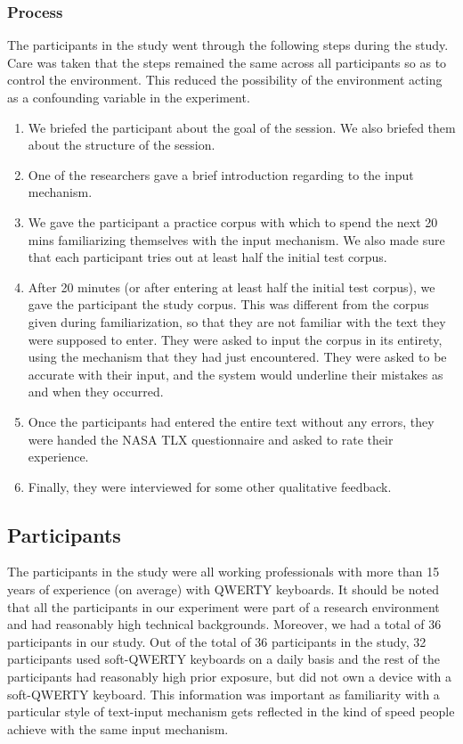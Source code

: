 \subsubsection{Process}

The participants in the study went through the following steps during
the study. Care was taken that the steps remained the same across all
participants so as to control the environment. This reduced the
possibility of the environment acting as a confounding variable in the
experiment. 

\begin{enumerate}
\item We briefed the participant about the goal of the session. We also
  briefed them about the structure of the session.
\item One of the researchers gave a brief introduction regarding to
  the input mechanism. 
\item We gave the participant a practice corpus with which to spend the next 20 mins familiarizing themselves with the input mechanism. We also made sure that each participant tries out at least half the initial test corpus. 
\item After 20 minutes (or after entering at least half the initial test corpus), we gave the participant the study corpus. This was different from the corpus given during familiarization, so that they are not familiar with the text they were supposed to enter. They were asked to input the corpus in its entirety, using the mechanism that they had just encountered. They were asked to be accurate with their input, and the system would underline their mistakes as and when they occurred.
\item Once the participants had entered the entire text without any
  errors, they were handed the NASA TLX questionnaire and asked to
  rate their experience.
\item Finally, they were interviewed for some other qualitative feedback.
\end{enumerate}

\subsection{Participants}
The participants in the study were all working professionals with more than 15 years of experience (on average) with QWERTY keyboards. It should be noted that all the participants in our experiment were part of a research environment and had reasonably high technical backgrounds. Moreover, we had a total of 36 participants in our study. Out of the total of 36 participants in the study, 32 participants used soft-QWERTY keyboards on a daily basis and the rest of the participants had reasonably high prior exposure, but did not own a device with a soft-QWERTY keyboard. This information was important as familiarity with a particular style of text-input mechanism gets reflected in the kind of speed people achieve with the same input mechanism. 
	